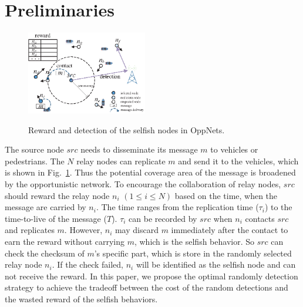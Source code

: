 \section{Preliminaries}
\label{sec:preli}
\begin{figure}
  \centering
  {\includegraphics[width=0.47\textwidth]{fig/sketch.eps}}
     \caption{Reward and detection of the selfish nodes in OppNets.}
     \label{fig:sketch}
\end{figure}
The source node $src$ needs to disseminate its message $m$
to vehicles or pedestrians.
The $N$ relay nodes can replicate $m$
and send it to the vehicles,
which is shown in Fig.~\ref{fig:sketch}.
Thus the potential coverage area of the message is broadened
by the opportunistic network.
To encourage the collaboration of relay nodes,
$src$ should reward the relay node $n_{i}$
$(1 \le i \le N)$ based on the time,
when the message are carried by $n_{i}$.
The time ranges from the replication time ($\tau_{i}$)
to the time-to-live of the message ($T$).
$\tau_{i}$ can be recorded by $src$ when
$n_{i}$ contacts $src$ and replicates $m$.
However, $n_{i}$ may discard $m$ immediately after the contact
to earn the reward without carrying $m$,
which is the selfish behavior.
So $src$ can check the checksum of $m$'s specific part,
which is store in the randomly selected relay node $n_{i}$.
If the check failed,
$n_{i}$ will be identified as the selfish node
and can not receive the reward.
In this paper, we propose the optimal randomly detection strategy
to achieve the tradeoff between
the cost of the random detections and
the wasted reward of the selfish behaviors.

